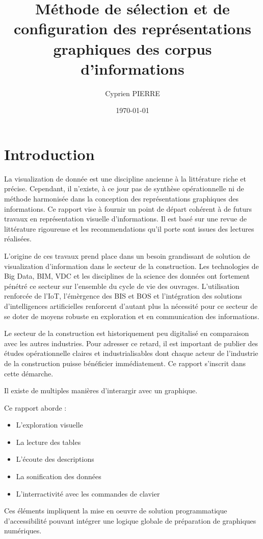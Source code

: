 \documentclass[11pt]{article}
\author{Cyprien PIERRE}
\date{\today}
\title{Méthode de sélection et de configuration des représentations graphiques des corpus d'informations}
\begin{document}
\maketitle
\tableofcontents

\section{Introduction}
\label{sec:org20b1c0c}
La visualization de donnée est une discipline ancienne à la littérature riche et précise. Cependant, il n'existe, à ce jour pas de synthèse opérationnelle ni de méthode harmonisée dans la conception des représentations graphiques des informations. Ce rapport vise à fournir un point de départ cohérent à de futurs travaux en représentation visuelle d'informations. Il est basé sur une revue de littérature rigoureuse et les recommendations qu'il porte sont issues des lectures réalisées.

L'origine de ces travaux prend place dans un besoin grandissant de solution de visualization d'information dans le secteur de la construction. Les technologies de Big Data, BIM, VDC et les disciplines de la science des données ont fortement pénétré ce secteur sur l'ensemble du cycle de vie des ouvrages. \autocite{asiauniversitytaichungtaiwanResearchApplicationFunctiontechnologyaesthetics2020} L'utilisation renforcée de l'IoT, l'émèrgence des BIS et BOS et l'intégration des solutions d'intelligences artificielles renforcent d'autant plus la nécessité pour ce secteur de se doter de moyens robuste en exploration et en communication des informations.

Le secteur de la construction est historiquement peu digitalisé en comparaison avec les autres industries. Pour adresser ce retard, il est important de publier des études opérationnelle claires et industrialisables dont chaque acteur de l'industrie de la construction puisse bénéficier immédiatement. Ce rapport s'inscrit dans cette démarche.

Il existe de multiples manières d'interargir avec un graphique. \autocite{schwabish1CenteringAccessibility2022,frankelavsky2RightTools2022}

Ce rapport aborde :
\begin{itemize}
\item L'exploration visuelle
\item La lecture des tables
\item L'écoute des descriptions
\item La sonification des données
\item L'interractivité avec les commandes de clavier
\end{itemize}
Ces éléments impliquent la mise en oeuvre de solution programmatique d'accessibilité pouvant intégrer une logique globale de préparation de graphiques numériques.
\end{document}

